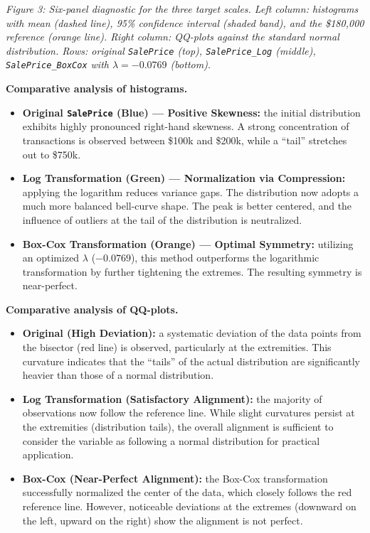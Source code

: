 \emph{Figure 3: Six-panel diagnostic for the three target scales. Left
column: histograms with mean (dashed line), 95\% confidence interval
(shaded band), and the \$180,000 reference (orange line). Right column:
QQ-plots against the standard normal distribution. Rows: original
\texttt{SalePrice} (top), \texttt{SalePrice\_Log} (middle),
\texttt{SalePrice\_BoxCox} with \(\lambda = -0.0769\) (bottom).}

\textbf{Comparative analysis of histograms.}

\begin{itemize}
\tightlist
\item
  \textbf{Original \texttt{SalePrice} (Blue) --- Positive Skewness:} the
  initial distribution exhibits highly pronounced right-hand skewness. A
  strong concentration of transactions is observed between \$100k and
  \$200k, while a ``tail'' stretches out to \$750k.
\item
  \textbf{Log Transformation (Green) --- Normalization via Compression:}
  applying the logarithm reduces variance gaps. The distribution now
  adopts a much more balanced bell-curve shape. The peak is better
  centered, and the influence of outliers at the tail of the
  distribution is neutralized.
\item
  \textbf{Box-Cox Transformation (Orange) --- Optimal Symmetry:}
  utilizing an optimized \(\lambda\) (\(-0.0769\)), this method
  outperforms the logarithmic transformation by further tightening the
  extremes. The resulting symmetry is near-perfect.
\end{itemize}

\textbf{Comparative analysis of QQ-plots.}

\begin{itemize}
\tightlist
\item
  \textbf{Original (High Deviation):} a systematic deviation of the data
  points from the bisector (red line) is observed, particularly at the
  extremities. This curvature indicates that the ``tails'' of the actual
  distribution are significantly heavier than those of a normal
  distribution.
\item
  \textbf{Log Transformation (Satisfactory Alignment):} the majority of
  observations now follow the reference line. While slight curvatures
  persist at the extremities (distribution tails), the overall alignment
  is sufficient to consider the variable as following a normal
  distribution for practical application.
\item
  \textbf{Box-Cox (Near-Perfect Alignment):} the Box-Cox transformation
  successfully normalized the center of the data, which closely follows
  the red reference line. However, noticeable deviations at the extremes
  (downward on the left, upward on the right) show the alignment is not
  perfect.
\end{itemize}

